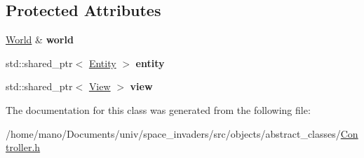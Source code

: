 \subsection*{Protected Attributes}
\begin{DoxyCompactItemize}
\item 
\mbox{\label{classobjects_1_1Controller_a6490e859b0c6d8e96ecc46d68585a81e}}
\hyperlink{classWorld}{World} \& {\bfseries world}
\item 
\mbox{\label{classobjects_1_1Controller_af114a0e2ca717f637b518c25bfa0c89a}}
std\+::shared\+\_\+ptr$<$ \hyperlink{classobjects_1_1Entity}{Entity} $>$ {\bfseries entity}
\item 
\mbox{\label{classobjects_1_1Controller_a8af4452aef4ef06e9798889fca6ea48d}}
std\+::shared\+\_\+ptr$<$ \hyperlink{classobjects_1_1View}{View} $>$ {\bfseries view}
\end{DoxyCompactItemize}


The documentation for this class was generated from the following file\+:\begin{DoxyCompactItemize}
\item 
/home/mano/\+Documents/univ/space\+\_\+invaders/src/objects/abstract\+\_\+classes/\hyperlink{Controller_8h}{Controller.\+h}\end{DoxyCompactItemize}
